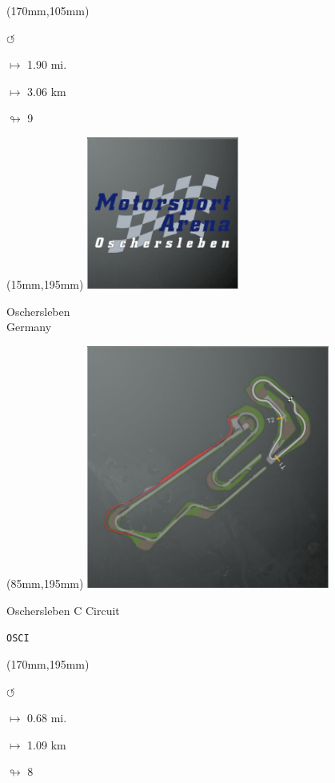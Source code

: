 \begin{textblock*}{30mm}(170mm,105mm)%
\par \Huge$\circlearrowleft$
\Large
\par$\mapsto$ 1.90 mi.
\par$\mapsto$ 3.06 km
\par$\looparrowright$ 9
\end{textblock*}
\begin{textblock*}{60mm}(15mm,195mm)%
\includegraphics[width=50mm]{LG/2015-05-20_00090.png}
\par Oschersleben\\ Germany
\end{textblock*}
\begin{textblock*}{80mm}(85mm,195mm)%
\includegraphics[width=80mm]{TR/2015-05-20_00047.png}
\centerline{Oschersleben C Circuit}
\par\hfill\tiny\tt OSCI\\
\end{textblock*}
\begin{textblock*}{30mm}(170mm,195mm)%
\par \Huge$\circlearrowleft$
\Large
\par$\mapsto$ 0.68 mi.
\par$\mapsto$ 1.09 km
\par$\looparrowright$ 8
\end{textblock*}
\null\newpage

